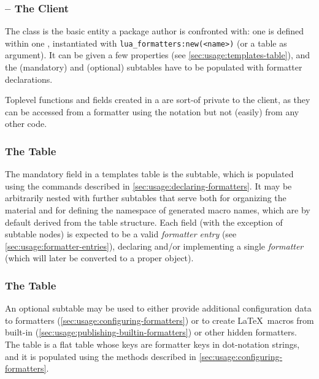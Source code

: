 \documentclass[12pt]{scrartcl}
\begin{document}
\subsubsection{ -- The Client}
\label{sec:advanced:templates-table}

The  class is the basic entity a package author is
confronted with: one  is defined within one ,
instantiated with \texttt{lua_formatters:new(<name>)} (or a table as
argument).  It can be given a few properties (see
\vref{sec:usage:templates-table}), and the  (mandatory) and
 (optional) subtables have to be populated with formatter
declarations.

Toplevel functions and fields created in a  are sort-of
private to the client, as they can be accessed from a formatter using the
 notation but not (easily) from any other code.

\subsubsection{The  Table}
\label{sec:advanced:the-formatter-table}

The mandatory field in a templates table is the  subtable,
which is populated using the commands described in
\vref{sec:usage:declaring-formatters}. It may be arbitrarily nested with further
subtables that serve both for organizing the material and for defining the
namespace of generated macro names, which are by default derived from the table
structure.  Each field (with the exception of subtable nodes) is expected to be
a valid \emph{formatter entry} (see \vref{sec:usage:formatter-entries}),
declaring and/or implementing a single \emph{formatter} (which will later be
converted to a proper  object).


\subsubsection{The  Table}
\label{sec:advanced:the-configuration-table}

An optional subtable  may be used to either provide
additional configuration data to formatters
(\vref{sec:usage:configuring-formatters}) or to create \LaTeX\ macros from
built-in (\vref{sec:usage:publishing-builtin-formatters}) or other hidden
formatters.  The table is a flat table whose keys are formatter keys in
dot-notation strings, and it is populated using the methods described in
\vref{sec:usage:configuring-formatters}.
\end{document}
